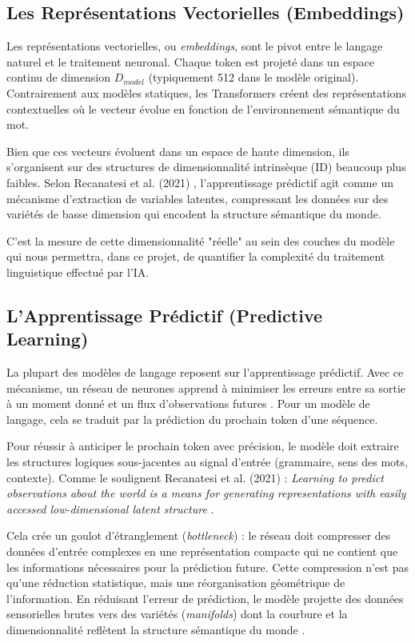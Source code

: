 \subsection{Les Représentations Vectorielles (Embeddings)}
Les représentations vectorielles, ou \textit{embeddings}, sont le pivot entre le langage naturel et le traitement neuronal. Chaque token est projeté dans un espace continu de dimension $D_{model}$ (typiquement 512 dans le modèle original). Contrairement aux modèles statiques, les Transformers créent des représentations contextuelles où le vecteur évolue en fonction de l'environnement sémantique du mot.

Bien que ces vecteurs évoluent dans un espace de haute dimension, ils s'organisent sur des structures de dimensionnalité intrinsèque (ID) beaucoup plus faibles. Selon Recanatesi et al. (2021) \cite{recanatesi2021predictive}, l'apprentissage prédictif agit comme un mécanisme d'extraction de variables latentes, compressant les données sur des variétés de basse dimension qui encodent la structure sémantique du monde.

C'est la mesure de cette dimensionnalité "réelle" au sein des couches du modèle qui nous permettra, dans ce projet, de quantifier la complexité du traitement linguistique effectué par l'IA.

\subsection{L'Apprentissage Prédictif (Predictive Learning)}
La plupart des modèles de langage reposent sur l’apprentissage prédictif. Avec ce mécanisme, un réseau de neurones apprend à minimiser les erreurs entre sa sortie à un moment donné et un flux d'observations futures \cite{recanatesi2021predictive}. Pour un modèle de langage, cela se traduit par la prédiction du prochain token d’une séquence.

Pour réussir à anticiper le prochain token avec précision, le modèle doit extraire les structures logiques sous-jacentes au signal d’entrée (grammaire, sens des mots, contexte). Comme le soulignent Recanatesi et al. (2021) : \og \textit{Learning to predict observations about the world is a means for generating representations with easily accessed low-dimensional latent structure} \fg{}.

Cela crée un goulot d’étranglement (\textit{bottleneck}) : le réseau doit compresser des données d’entrée complexes en une représentation compacte qui ne contient que les informations nécessaires pour la prédiction future. Cette compression n’est pas qu’une réduction statistique, mais une réorganisation géométrique de l’information. En réduisant l'erreur de prédiction, le modèle projette des données sensorielles brutes vers des variétés (\textit{manifolds}) dont la courbure et la dimensionnalité reflètent la structure sémantique du monde \cite{recanatesi2021predictive}.

